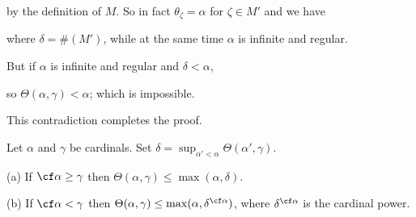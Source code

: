 {

\noindent by the definition of $M$.
So in fact $\theta_{\zeta}=\alpha$ for $\zeta\in M'$ and we have


\noindent where $\delta=\#(M')$, while at the same time $\alpha$
is infinite and regular.

But if $\alpha$ is infinite and regular and $\delta<\alpha$,

\Centerline{$\cf(\prod_{\zeta<\delta}\alpha)\le\alpha$,}

\noindent so $\Theta(\alpha,\gamma)<\alpha$;  which is impossible.\ \Bang

This contradiction completes the proof.
}%

Let $\alpha$ and $\gamma$ be cardinals.   Set
$\delta=\sup_{\alpha'<\alpha}\Theta(\alpha',\gamma)$.

(a) If $\cf\alpha\ge\gamma$ then
$\Theta(\alpha,\gamma)\le\max(\alpha,\delta)$.

(b) If $\cf\alpha<\gamma$ then
$\Theta(\alpha,\gamma)\le\max(\alpha,\delta^{\cf\alpha})$, where
$\delta^{\cf\alpha}$ is the cardinal power.

